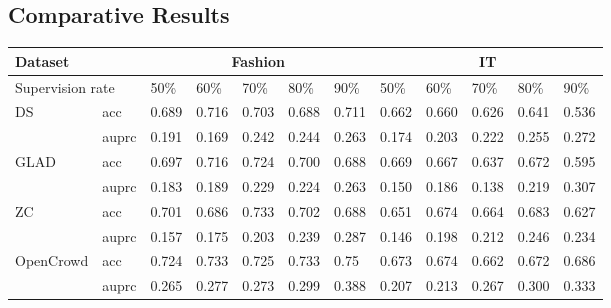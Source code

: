 \subsection{Comparative Results}
\begin{table*}[!h]
\begin{tabular}{|l|l|l|l|l|l|l|l|l|l|l|l|}
\hline
\multicolumn{2}{|l|}{Dataset}          & \multicolumn{5}{c|}{Fashion}          & \multicolumn{5}{c|}{IT}               \\ \hline
\multicolumn{2}{|l|}{Supervision rate} & 50\%  & 60\%  & 70\%  & 80\%  & 90\%  & 50\%  & 60\%  & 70\%  & 80\%  & 90\%  \\ \hline
\multirow{2}{*}{DS}          & acc     & 0.689 & 0.716 & 0.703 & 0.688 & 0.711 & 0.662 & 0.660 & 0.626 & 0.641 & 0.536 \\ \cline{2-12} 
                             & auprc   & 0.191 & 0.169 & 0.242 & 0.244 & 0.263 & 0.174 & 0.203 & 0.222 & 0.255 & 0.272 \\ \hline
\multirow{2}{*}{GLAD}        & acc     & 0.697 & 0.716 & 0.724 & 0.700 & 0.688 & 0.669 & 0.667 & 0.637 & 0.672 & 0.595 \\ \cline{2-12} 
                             & auprc   & 0.183 & 0.189 & 0.229 & 0.224 & 0.263 & 0.150 & 0.186 & 0.138 & 0.219 & 0.307 \\ \hline
\multirow{2}{*}{ZC}          & acc     & 0.701 & 0.686 & 0.733 & 0.702 & 0.688 & 0.651 & 0.674 & 0.664 & 0.683 & 0.627 \\ \cline{2-12} 
                             & auprc   & 0.157 & 0.175 & 0.203 & 0.239 & 0.287 & 0.146 & 0.198 & 0.212 & 0.246 & 0.234 \\ \hline
\multirow{2}{*}{OpenCrowd}   & acc     & 0.724 & 0.733 & 0.725 & 0.733 & 0.75  & 0.673 &   0.674  &   0.662     &     0.672   &   0.686    \\ \cline{2-12} 
                             & auprc   & 0.265 & 0.277 & 0.273 & 0.299 & 0.388  &  0.207     &   0.213    &  0.267     &  0.300  &  0.333 \\ \hline
\end{tabular}
\end{table*}
\label{sec:compres}